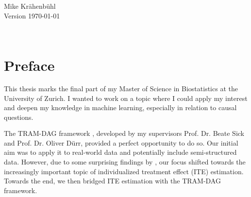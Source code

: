 \documentclass[11pt,a4paper,twoside]{book}
\begin{document}


\graphicspath{{./figure/}}
\setcounter{tocdepth}{1}

\thispagestyle{empty}
\begin{center}
%

	\vspace*{6cm}{\bfseries\Huge
	Causal Modeling with Neural Networks \\ [5mm]
and \\ [5mm]
Individualized Treatment Effect Estimation \\ [5mm]
	}
	
	

  \vfill
  \rm

  \LARGE
  Mike Kr{\"a}henb{\"u}hl\\[12mm]
  
  \normalsize
  Version \today
\end{center}
\newpage
\thispagestyle{empty}~
\newpage
{}

\thispagestyle{plain}
\tableofcontents
{}

\chapter*{Preface}
\thispagestyle{plain}



This thesis marks the final part of my Master of Science in Biostatistics at the University of Zurich. I wanted to work on a topic where I could apply my interest and deepen my knowledge in machine learning, especially in relation to causal questions.

The TRAM-DAG framework \citep{sick2025}, developed by my supervisors Prof. Dr. Beate Sick and Prof. Dr. Oliver D{\"u}rr, provided a perfect opportunity to do so. Our initial aim was to apply it to real-world data and potentially include semi-structured data. However, due to some surprising findings by \citet{chen2025}, our focus shifted towards the increasingly important topic of individualized treatment effect (ITE) estimation. Towards the end, we then bridged ITE estimation with the TRAM-DAG framework.
\end{document}

